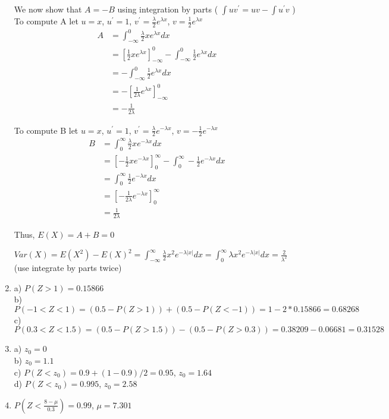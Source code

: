\documentclass[11pt]{article}
\begin{document}
\begin{enumerate}
    \noindent We now show that $A = -B $ using integration by parts ( $\int uv^{\prime} = uv - \int u^{\prime}v$ ) \\
    To compute A let $u = x$, $ u^{\prime} = 1$, $v^{\prime} = \frac{\lambda}{2}e^{\lambda x}$, $ v =  \frac{1}{2}e^{\lambda x}$
    \begin{align*}
    A &= \int_{-\infty}^{0}\frac{\lambda}{2} xe^{\lambda x}dx \\
      &=[\frac{1}{2}xe^{\lambda x}]_{-\infty}^{0} - \int_{-\infty}^{0} \frac{1}{2}e^{\lambda x}dx  \\
      &=-\int_{-\infty}^{0} \frac{1}{2}e^{\lambda x}dx \\
      &=-[\frac{1}{2\lambda} e^{\lambda x}]_{-\infty}^{0} \\
      &=-\frac{1}{2\lambda}
    \end{align*}
    
    \noindent To compute B let $u = x$, $ u^{\prime} = 1$, $v^{\prime} = \frac{\lambda}{2}e^{- \lambda x}$, $ v =  -\frac{1}{2}e^{- \lambda x}$
    \begin{align*}
    B &= \int_{0}^{\infty}\frac{\lambda}{2} xe^{ - \lambda x}dx \\
      &=[-\frac{1}{2}xe^{-\lambda x}]_{0}^{\infty} - \int_{0}^{\infty} -\frac{1}{2}e^{ - \lambda x}dx  \\
      &=\int_{0}^{\infty} \frac{1}{2}e^{-\lambda x}dx \\
      &=[-\frac{1}{2\lambda} e^{-\lambda x}]_{0}^{\infty} \\
      &=\frac{1}{2\lambda}
    \end{align*}
    
    \noindent Thus, $E(X) = A + B = 0$
    
   $Var(X) = E(X^2) - E(X)^2 = \int_{-\infty}^{\infty}\frac{\lambda}{2} x^2e^{-\lambda |x|}dx = \int_{0}^{\infty}\lambda x^2e^{-\lambda |x|}dx = \frac{2}{\lambda^2}$ 
   \\ \noindent (use integrate by parts twice) \\
  \item a) $P(Z > 1) = 0.15866$ \\
  b) $P(-1 < Z < 1) = (0.5 - P(Z > 1)) + (0.5 - P(Z < -1)) = 1 - 2 * 0.15866 = 0.68268$ \\
  c) $P(0.3 < Z < 1.5) = (0.5 - P(Z > 1.5)) - (0.5 - P(Z > 0.3)) = 0.38209 - 0.06681 = 0.31528 $
  \item a) $z_0 = 0$ \\
  b) $z_0 = 1.1$ \\
  c) $P(Z < z_0) = 0.9 + (1 - 0.9) / 2 = 0.95$, $z_0 = 1.64$ \\
  d) $P(Z < z_0) = 0.995$, $z_0 = 2.58$ \\
  \item $P(Z < \frac{8 - \mu}{0.3}) = 0.99$, $\mu = 7.301$
  
\end{enumerate}
\end{document}
